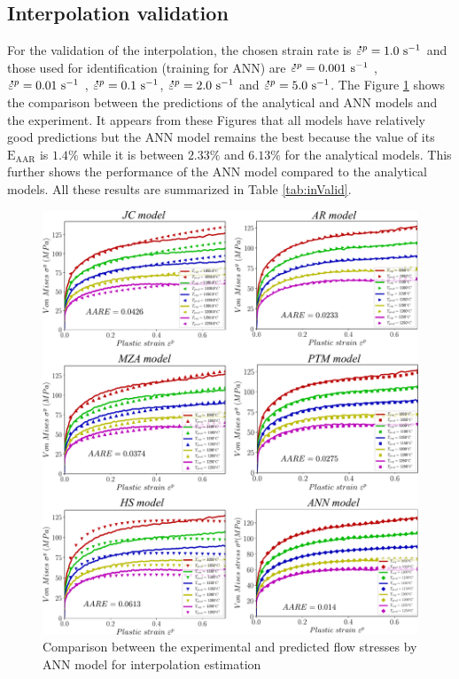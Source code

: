 \documentclass[twoside,english,1p,final,sort&compress]{elsarticle}
\theoremstyle{plain}
\newcommand{\mdot}[1]{\accentset{\mbox{\bfseries .}}{#1}}
\newcommand{\AARE}{\text{E}_\text{AAR}}
\begin{document}
\subsection{Interpolation validation}
For the validation of the interpolation, the chosen strain rate is $\mdot{\varepsilon}^p = 1.0\ \text{s}^{-1}$ and those used for identification (training for ANN) are $\mdot{\varepsilon}^p = 0.001\ \text{s}^{-1}$ , $\mdot{\varepsilon}^p = 0.01\ \text{s}^{-1}$ , $\mdot{\varepsilon}^p = 0.1\ \text{s}^{-1}$, $\mdot{\varepsilon}^p = 2.0\ \text{s}^{-1}$  and $\mdot{\varepsilon}^p = 5.0\ \text{s}^{-1}$. The Figure \ref{fig:inCombinaison} shows the comparison between the predictions of the analytical and ANN models and the experiment. It appears from these Figures that all models have relatively good predictions but the ANN model remains the best because the value of its $\AARE$ is $1.4\%$ while it is between $2.33\%$ and $6.13\%$ for the analytical models. This further shows the performance of the ANN model compared to the analytical models. All these results are summarized in Table \ref{tab:inValid}.
\begin{figure}[!ht]
\centering
\includegraphics[width=1.02\columnwidth]
{Figures/inCombinaison}
\caption{Comparison between the experimental and predicted flow stresses by ANN model for interpolation estimation}
\label{fig:inCombinaison}
\end{figure}
\end{document}
